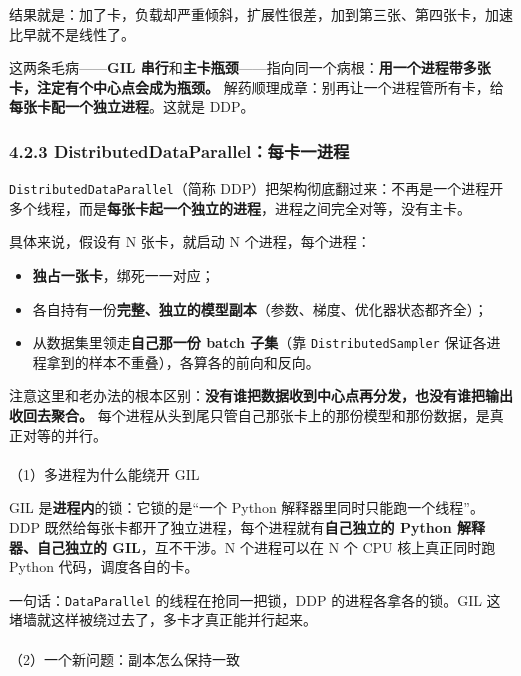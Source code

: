 \documentclass[
  chinese,
]{ctexart}
\makeatletter
\let\oldparagraph\paragraph
\renewcommand{\paragraph}{
    \@ifstar
      \xxxParagraphStar
      \xxxParagraphNoStar
  }
\newcommand{\xxxParagraphStar}[1]{\oldparagraph*{#1}\mbox{}}
\newcommand{\xxxParagraphNoStar}[1]{\oldparagraph{#1}\mbox{}}
\providecommand{\tightlist}{%
  \setlength{\itemsep}{0pt}\setlength{\parskip}{0pt}}
\makeatother
\begin{document}
结果就是：加了卡，负载却严重倾斜，扩展性很差，加到第三张、第四张卡，加速比早就不是线性了。

这两条毛病------\textbf{GIL
串行}和\textbf{主卡瓶颈}------指向同一个病根：\textbf{用一个进程带多张卡，注定有个中心点会成为瓶颈。}
解药顺理成章：别再让一个进程管所有卡，给\textbf{每张卡配一个独立进程}。这就是
DDP。

\subsubsection{4.2.3
DistributedDataParallel：每卡一进程}\label{distributeddataparallelux6bcfux5361ux4e00ux8fdbux7a0b}

\texttt{DistributedDataParallel}（简称
DDP）把架构彻底翻过来：不再是一个进程开多个线程，而是\textbf{每张卡起一个独立的进程}，进程之间完全对等，没有主卡。

具体来说，假设有 N 张卡，就启动 N 个进程，每个进程：

\begin{itemize}
\tightlist
\item
  \textbf{独占一张卡}，绑死一一对应；
\item
  各自持有一份\textbf{完整、独立的模型副本}（参数、梯度、优化器状态都齐全）；
\item
  从数据集里领走\textbf{自己那一份 batch 子集}（靠
  \texttt{DistributedSampler}
  保证各进程拿到的样本不重叠），各算各的前向和反向。
\end{itemize}

注意这里和老办法的根本区别：\textbf{没有谁把数据收到中心点再分发，也没有谁把输出收回去聚合。}
每个进程从头到尾只管自己那张卡上的那份模型和那份数据，是真正对等的并行。

\paragraph{（1）多进程为什么能绕开
GIL}\label{ux591aux8fdbux7a0bux4e3aux4ec0ux4e48ux80fdux7ed5ux5f00-gil}

GIL 是\textbf{进程内}的锁：它锁的是``一个 Python
解释器里同时只能跑一个线程''。DDP
既然给每张卡都开了独立进程，每个进程就有\textbf{自己独立的 Python
解释器、自己独立的 GIL}，互不干涉。N 个进程可以在 N 个 CPU
核上真正同时跑 Python 代码，调度各自的卡。

一句话：\texttt{DataParallel} 的线程在抢同一把锁，DDP
的进程各拿各的锁。GIL 这堵墙就这样被绕过去了，多卡才真正能并行起来。

\paragraph{（2）一个新问题：副本怎么保持一致}\label{ux4e00ux4e2aux65b0ux95eeux9898ux526fux672cux600eux4e48ux4fddux6301ux4e00ux81f4}
\end{document}
